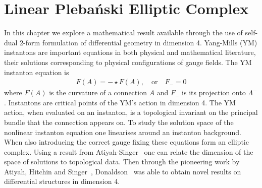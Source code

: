 \documentclass[10pt]{report}
\newcommand{\pleb}[0]{Pleba\'nski}
\theoremstyle{definition}
\begin{document}
\chapter{Linear \pleb{} Elliptic Complex}\label{chap:Plebanski-Elliptic-Complex}
In this chapter we explore a mathematical result available through the use of self-dual 2-form formulation of differential geometry in dimension 4. Yang-Mills (YM) instantons are important equations in both physical and mathematical literature, their solutions corresponding to physical configurations of gauge fields. The YM instanton equation is 
\begin{align}
    F(A) = - \star F(A), \quad \textrm{or} \quad F_- = 0 \label{eq:ell-yang-mills-instanton-condition}
\end{align}
where $F(A)$ is the curvature of a connection $A$ and $F_-$ is its projection onto $\Lambda^-$. Instantons are critical points of the YM's action in dimension 4. The YM action, when evaluated on an instanton, is a topological invariant on the principal bundle that the connection appears on. To study the solution space of the nonlinear instanton equation one linearises around an instanton background. When also introducing the correct gauge fixing these equations form an elliptic complex. Using a result from Atiyah-Singer~\cite{The_Index_of_El_Atiyah_1968} one can relate the dimension of the space of solutions to topological data. Then through the pioneering work by Atiyah, Hitchin and Singer~\cite{AtiyahHitchinSingerSelfDual1978}, Donaldson~\cite{DonaldsonSelfDual1983} was able to obtain novel results on differential structures in dimension 4.
\end{document}
